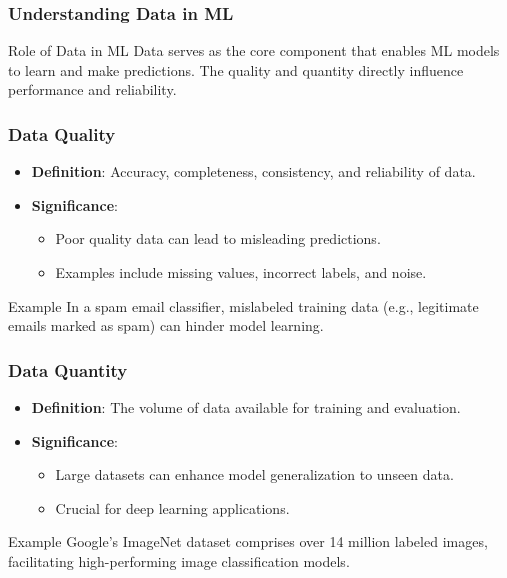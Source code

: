 \documentclass[aspectratio=169]{beamer}
\begin{document}
\begin{frame}[fragile]
    \frametitle{Understanding Data in ML}
    \begin{block}{Role of Data in ML}
        Data serves as the core component that enables ML models to learn and make predictions. 
        The quality and quantity directly influence performance and reliability.
    \end{block}
\end{frame}

\begin{frame}[fragile]
    \frametitle{Data Quality}
    \begin{itemize}
        \item \textbf{Definition}: Accuracy, completeness, consistency, and reliability of data.
        \item \textbf{Significance}: 
            \begin{itemize}
                \item Poor quality data can lead to misleading predictions.
                \item Examples include missing values, incorrect labels, and noise.
            \end{itemize}
    \end{itemize}
    \begin{block}{Example}
        In a spam email classifier, mislabeled training data (e.g., legitimate emails marked as spam) can hinder model learning.
    \end{block}
\end{frame}

\begin{frame}[fragile]
    \frametitle{Data Quantity}
    \begin{itemize}
        \item \textbf{Definition}: The volume of data available for training and evaluation.
        \item \textbf{Significance}: 
            \begin{itemize}
                \item Large datasets can enhance model generalization to unseen data.
                \item Crucial for deep learning applications.
            \end{itemize}
    \end{itemize}
    \begin{block}{Example}
        Google's ImageNet dataset comprises over 14 million labeled images, facilitating high-performing image classification models.
    \end{block}
\end{frame}
\end{document}
